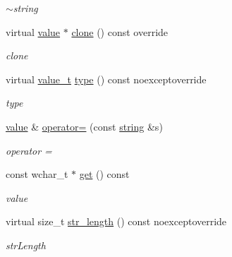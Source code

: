 \begin{DoxyCompactItemize}
\begin{DoxyCompactList}\small\item\em $\sim$string \end{DoxyCompactList}\item 
virtual \hyperlink{classformat_1_1value_aa6b85823936bf7b8ab78d3f8d443c00d}{value} $\ast$ \hyperlink{classformat_1_1string_a41b0ffc3e1c686bc07fbe911942a0a4f}{clone} () const override
\begin{DoxyCompactList}\small\item\em clone \end{DoxyCompactList}\item 
virtual \hyperlink{classformat_1_1value_aa0334be06389a7b14af485fa0cd3aa21}{value\+\_\+t} \hyperlink{classformat_1_1string_a247e17aaf8cb8e0afdc29e943d492232}{type} () const noexceptoverride
\begin{DoxyCompactList}\small\item\em type \end{DoxyCompactList}\item 
\hyperlink{classformat_1_1value_aa6b85823936bf7b8ab78d3f8d443c00d}{value} \& \hyperlink{classformat_1_1string_a6b45888b8f15e35546b7f0f0007a795c}{operator=} (const \hyperlink{classformat_1_1string}{string} \&s)
\begin{DoxyCompactList}\small\item\em operator = \end{DoxyCompactList}\item 
const wchar\+\_\+t $\ast$ \hyperlink{classformat_1_1string_af8468eab8f5499b2f1bfde6a680fab47}{get} () const 
\begin{DoxyCompactList}\small\item\em value \end{DoxyCompactList}\item 
virtual size\+\_\+t \hyperlink{classformat_1_1string_a6447b6867f08a78e0bd82cc7c63d2f6e}{str\+\_\+length} () const noexceptoverride
\begin{DoxyCompactList}\small\item\em str\+Length \end{DoxyCompactList}\end{DoxyCompactItemize}
